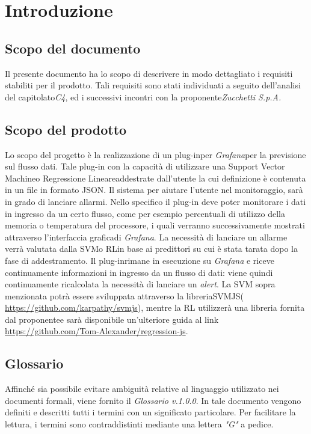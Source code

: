 \section{Introduzione}
	\subsection{Scopo del documento}
		Il presente documento ha lo scopo di descrivere in modo dettagliato i requisiti stabiliti per il prodotto. Tali requisiti sono stati individuati a seguito dell'analisi del capitolato\glo \emph{C4}, ed i successivi incontri con la proponente\glo \emph{Zucchetti S.p.A.}

	
\subsection{Scopo del prodotto}
   Lo scopo del progetto è la realizzazione di un plug-in\glo per \emph{Grafana}\glo per la previsione sul flusso dati\glo. Tale plug-in con la capacità di utilizzare una Support Vector Machine\glo o Regressione Lineare\glo addestrate dall'utente la cui definizione è contenuta in un file in formato JSON\glo. Il sistema per aiutare l’utente nel monitoraggio, sarà in grado di lanciare allarmi.
Nello specifico il plug-in deve poter monitorare i dati in ingresso da un certo flusso, come per esempio percentuali di utilizzo della memoria o temperatura del processore, i quali verranno successivamente mostrati attraverso l'interfaccia grafica\glo di \emph{Grafana}.
La necessità di lanciare un allarme verrà valutata dalla SVM\glo o RL\glo in base ai predittori su cui è stata tarata dopo la fase di addestramento.
Il plug-in\glo rimane in esecuzione su \emph{Grafana} e riceve continuamente informazioni in ingresso da un flusso di dati: viene quindi continuamente ricalcolata la necessità di lanciare un \emph{alert}\glo.
La SVM sopra menzionata potrà essere sviluppata attraverso la libreria\glo SVMJS\glo (\url{ https://github.com/karpathy/svmjs}), mentre la RL utilizzerà una libreria fornita dal proponente\glo e sarà disponibile un’ulteriore guida al link \url{https://github.com/Tom-Alexander/regression-js}.

	
	\subsection{Glossario}
		Affinché sia possibile evitare ambiguità relative al linguaggio utilizzato nei documenti formali, viene fornito il \emph{Glossario v.1.0.0}. In tale documento vengono definiti e descritti tutti i termini con un significato particolare. Per facilitare la lettura, i termini sono contraddistinti mediante una lettera \emph{"G"} a pedice.
		

